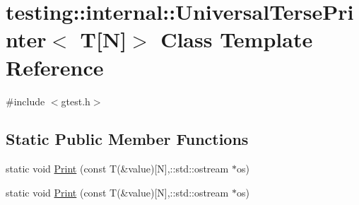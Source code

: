 \hypertarget{classtesting_1_1internal_1_1_universal_terse_printer_3_01_t[_n]_4}{\section{testing\-:\-:internal\-:\-:Universal\-Terse\-Printer$<$ T\mbox{[}N\mbox{]}$>$ Class Template Reference}
\label{classtesting_1_1internal_1_1_universal_terse_printer_3_01_t[_n]_4}
}


{\ttfamily \#include $<$gtest.\-h$>$}

\subsection*{Static Public Member Functions}
\begin{DoxyCompactItemize}
\item 
static void \hyperlink{classtesting_1_1internal_1_1_universal_terse_printer_3_01_t[_n]_4_ab86be2fbff7bb8fb2113e9ade3899a56}{Print} (const T(\&value)\mbox{[}N\mbox{]},\-::std\-::ostream $\ast$os)
\item 
static void \hyperlink{classtesting_1_1internal_1_1_universal_terse_printer_3_01_t[_n]_4_ab86be2fbff7bb8fb2113e9ade3899a56}{Print} (const T(\&value)\mbox{[}N\mbox{]},\-::std\-::ostream $\ast$os)
\end{DoxyCompactItemize}


